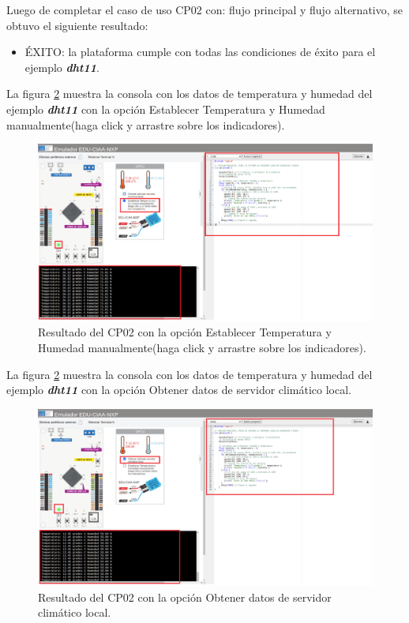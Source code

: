 Luego de completar el caso de uso CP02 con: flujo principal y flujo alternativo, se obtuvo el siguiente resultado: 

\begin{itemize}
	\item ÉXITO: la plataforma cumple con todas las condiciones de éxito para el ejemplo \textit{\textbf{dht11}}.
\end{itemize}

La figura \ref{fig:RespuestaEmulador} muestra la consola con los datos de temperatura y humedad del ejemplo \textit{\textbf{dht11}} con la opción \textquotedbl  Establecer Temperatura y Humedad manualmente(haga click y arrastre sobre
los indicadores).\textquotedbl

\hfill \break
\hfill \break
\hfill \break

\begin{figure}[ht]
	\centering
	\includegraphics[scale=.20]{./Figures/dht11Opcion2.png}
	\caption{Resultado del CP02 con la opción \textquotedbl Establecer Temperatura y Humedad manualmente(haga click y arrastre sobre
los indicadores).\textquotedbl}
	\label{fig:RespuestaEmulador}
\end{figure}


La figura \ref{fig:RespuestaEmulador} muestra la consola con los datos de temperatura y humedad del ejemplo \textit{\textbf{dht11}} con la opción \textquotedbl Obtener datos de servidor climático local.\textquotedbl


\begin{figure}[ht]
	\centering
	\includegraphics[scale=.20]{./Figures/dht11Opcion1.png}
	\caption{Resultado del  CP02 con la opción \textquotedbl Obtener datos de servidor climático local.\textquotedbl}
	\label{fig:RespuestaEmulador}
\end{figure}





